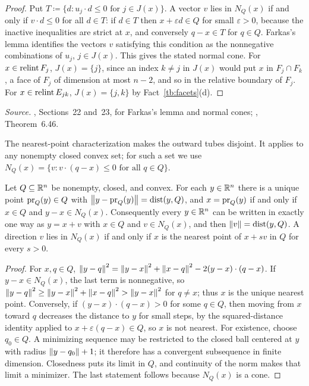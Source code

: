 \begin{proof}
Put \(T\coloneqq \{d:u_j\cdot d\le0\text{ for }j\in J(x)\}\). A vector \(v\) lies in
\(N_Q(x)\) if and only if \(v\cdot d\le0\) for all \(d\in T\): if \(d\in T\)
then \(x+\varepsilon d\in Q\) for small \(\varepsilon>0\), because the
inactive inequalities are strict at \(x\), and conversely \(q-x\in T\) for
\(q\in Q\). Farkas's lemma identifies the vectors \(v\) satisfying this
condition as the nonnegative combinations of \(u_j\), \(j\in J(x)\).
This gives the stated normal cone. For \(x\in\operatorname{relint} F_j\), \(J(x)=\{j\}\), since an index \(k\ne j\) in
\(J(x)\) would put \(x\) in \(F_j\cap F_k\), a face of \(F_j\) of dimension
at most \(n-2\), and so in the relative boundary of \(F_j\). For
\(x\in\operatorname{relint} E_{jk}\), \(J(x)=\{j,k\}\) by Fact~\ref{tb:facets}(d).
\end{proof}

\emph{Source.} , Sections~22 and~23, for Farkas's lemma and normal
cones; , Theorem~6.46.

The nearest-point characterization makes the outward tubes disjoint.
It applies to any nonempty closed convex set; for such a set we use
\(N_Q(x)=\{v:v\cdot(q-x)\le0\text{ for all }q\in Q\}\).

\begin{fact}\label{tb:projection}
Let \(Q\subseteq\mathbb R^n\) be nonempty, closed, and convex. For each
\(y\in\mathbb R^n\) there is a unique point \(\operatorname{pr}_Q(y)\in Q\) with
\(\left\lVert y-\operatorname{pr}_Q(y)\right\rVert=\operatorname{dist}(y,Q)\), and \(x=\operatorname{pr}_Q(y)\) if and only if
\(x\in Q\) and \(y-x\in N_Q(x)\). Consequently every \(y\in\mathbb R^n\) can be
written in exactly one way as \(y=x+v\) with \(x\in Q\) and \(v\in N_Q(x)\),
and then \(\left\lVert v\right\rVert=\operatorname{dist}(y,Q)\). A direction \(v\) lies in \(N_Q(x)\) if and
only if \(x\) is the nearest point of \(x+s v\) in \(Q\) for every \(s>0\).
\end{fact}

\begin{proof}
For \(x,q\in Q\), \(\left\lVert y-q\right\rVert^2=\left\lVert y-x\right\rVert^2+\left\lVert x-q\right\rVert^2-2(y-x)\cdot(q-x)\).
If \(y-x\in N_Q(x)\), the last term is nonnegative, so
\(\left\lVert y-q\right\rVert^2\ge\left\lVert y-x\right\rVert^2+\left\lVert x-q\right\rVert^2>\left\lVert y-x\right\rVert^2\) for \(q\ne x\); thus
\(x\) is the unique nearest point. Conversely, if \((y-x)\cdot(q-x)>0\) for
some \(q\in Q\), then moving from \(x\) toward \(q\) decreases the distance
to \(y\) for small steps, by the squared-distance identity applied to
\(x+\varepsilon(q-x)\in Q\), so \(x\) is not nearest. For existence, choose \(q_0\in Q\). A minimizing sequence may be
restricted to the closed ball centered at \(y\) with radius
\(\left\lVert y-q_0\right\rVert+1\); it therefore has a convergent subsequence in
finite dimension. Closedness puts its limit in \(Q\), and continuity
of the norm makes that limit a minimizer. The last statement follows because \(N_Q(x)\) is a
cone.
\end{proof}

